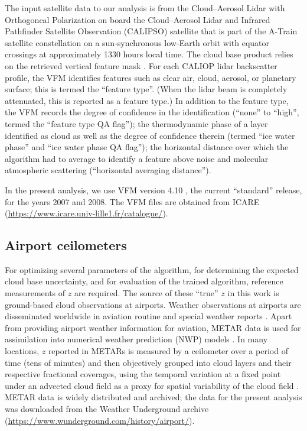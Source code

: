 \documentclass[essd,manuscript]{copernicus}\usepackage[]{graphicx}\usepackage[]{color}
\newcommand\CBH{\ensuremath{z}}
\begin{document}
The input satellite data to our analysis is from the Cloud--Aerosol Lidar with
Orthogoncal Polarization \cite[CALIOP][]{Winker2007} on board the Cloud--Aerosol Lidar and Infrared Pathfinder
Satellite Observation (CALIPSO) satellite that is part of the A-Train
satellite constellation \citep{Stephens2002} on a
sun-synchronous low-Earth orbit with equator crossings at approximately 1330 hours local
time. The cloud base product relies on the retrieved vertical feature mask
\citep[VFM,][]{vaughan2002}.  For each CALIOP lidar backscatter profile, the VFM identifies features
such as clear air, cloud, aerosol, or planetary surface; this is termed the ``feature
type''.  (When the lidar beam is completely attenuated, this is reported as a
feature type.)  In addition to the feature type, the VFM records the degree of
confidence in the identification (``none'' to ``high'', termed the ``feature
type QA flag''); the thermodynamic phase of a layer identified as cloud as well
as the degree of confidence therein (termed ``ice water phase'' and ``ice water
phase QA flag''); the horizontal distance over which the algorithm had to
average to identify a feature above noise and molecular atmospheric scattering
(``horizontal averaging distance'').  

In the present analysis, we use VFM version 4.10 \citep{vfm}, the current
``standard'' release, for the years 2007 and 2008.  The VFM files are obtained
from ICARE (\url{https://www.icare.univ-lille1.fr/catalogue/}).

\subsection{Airport ceilometers}





For optimizing several parameters of the algorithm, for determining the expected
cloud base uncertainty, and for evaluation of the trained algorithm, reference
measurements of \CBH{} are required.  The source of these ``true'' \CBH{} in this work
is ground-based cloud observations at airports.  Weather observations at
airports are disseminated worldwide in aviation routine and special weather
reports \citep[METARs and SPECIs, collectively referred to as METARs
henceforth,][]{metar}.  Apart from providing airport weather information for
aviation, METAR data is used for assimilation into numerical weather prediction
(NWP) models \citep[e.g.,][]{Benjamin2016, Dee2011}.  In many locations, \CBH{}
reported in METARs is measured by a ceilometer over a period of time (tens of
minutes) and then objectively grouped into cloud layers and their respective
fractional coverages, using the temporal variation at a fixed point under an
advected cloud field as a proxy for spatial variability of the cloud field
\citep[e.g.,][]{Heese2010}.  METAR data is widely distributed and archived; the
data for the present analysis was downloaded from the Weather Underground
archive (\url{https://www.wunderground.com/history/airport/}).
\end{document}
